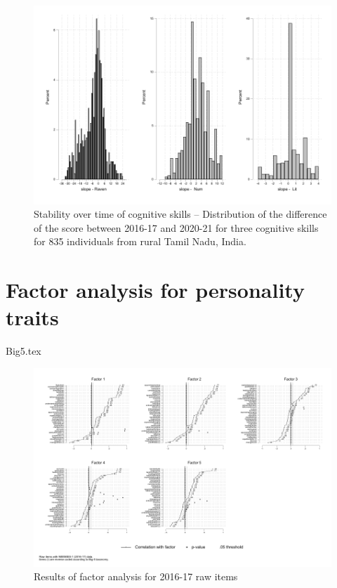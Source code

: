 \documentclass[a4paper, 12pt, onecolumn]{article}
\begin{document}
\begin{figure}[!htb]
\raggedright
\includegraphics[scale=0.86]{INPUT/diffcont_cog}
\caption{Stability over time of cognitive skills -- Distribution of the difference of the score between 2016-17 and 2020-21 for three cognitive skills for 835 individuals from rural Tamil Nadu, India.}
\label{fig:stabcog}
\end{figure}


\clearpage
\newpage
\section{Factor analysis for personality traits}
\label{section:efa_big5}


{Big5.tex}

\clearpage
\begin{figure}[!htb]
\raggedright
\includegraphics[width=\textwidth, angle=0]{INPUT/factor2016_2}
\caption{Results of factor analysis for 2016-17 raw items}
\label{fig:resefa}
\end{figure}
\end{document}
